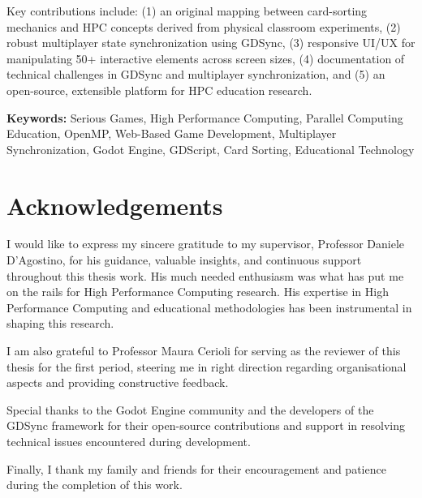 \documentclass[twoside]{./class/masterthesis}
\begin{document}
Key contributions include: (1) an original mapping between card-sorting mechanics and HPC concepts derived from physical classroom experiments, (2) robust multiplayer state synchronization using GDSync, (3) responsive UI/UX for manipulating 50+ interactive elements across screen sizes, (4) documentation of technical challenges in GDSync and multiplayer synchronization, and (5) an open-source, extensible platform for HPC education research.

\textbf{Keywords:} Serious Games, High Performance Computing, Parallel Computing Education, OpenMP, Web-Based Game Development, Multiplayer Synchronization, Godot Engine, GDScript, Card Sorting, Educational Technology


\chapter*{Acknowledgements}

I would like to express my sincere gratitude to my supervisor, Professor Daniele D'Agostino, for his guidance, valuable insights, and continuous support throughout this thesis work. His much needed enthusiasm was what has put me on the rails for High Performance Computing research. His expertise in High Performance Computing and educational methodologies has been instrumental in shaping this research.

I am also grateful to Professor Maura Cerioli for serving as the reviewer of this thesis for the first period, steering me in right direction regarding organisational aspects and providing constructive feedback.

Special thanks to the Godot Engine community and the developers of the GDSync framework for their open-source contributions and support in resolving technical issues encountered during development.

Finally, I thank my family and friends for their encouragement and patience during the completion of this work.


\tableofcontents
\listoffigures
\listoftables
\lstlistoflistings
\end{document}
